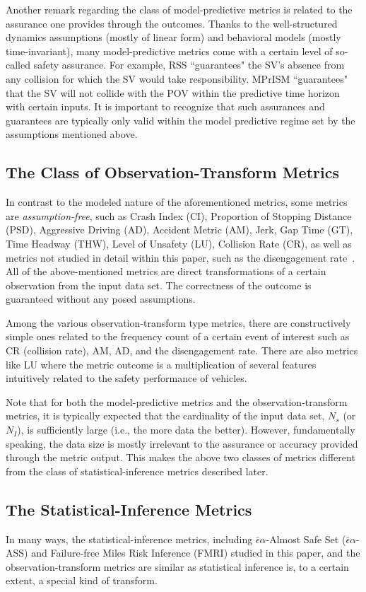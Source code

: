 \documentclass[journal]{IEEEtran}
\begin{document}
Another remark regarding the class of model-predictive metrics is related to the assurance one provides through the outcomes. Thanks to the well-structured dynamics assumptions (mostly of linear form) and behavioral models (mostly time-invariant), many model-predictive metrics come with a certain level of so-called safety assurance. For example, RSS ``guarantees" the SV's absence from any collision for which the SV would take responsibility. MPrISM ``guarantees" that the SV will not collide with the POV within the predictive time horizon with certain inputs. It is important to recognize that such assurances and guarantees are typically only valid within the model predictive regime set by the assumptions mentioned above.

\subsection{The Class of Observation-Transform Metrics}
In contrast to the modeled nature of the aforementioned metrics, some metrics are \emph{assumption-free}, such as Crash Index (CI), Proportion of Stopping Distance (PSD), Aggressive Driving (AD), Accident Metric (AM), Jerk, Gap Time (GT), Time Headway (THW), Level of Unsafety (LU), Collision Rate (CR), as well as metrics not studied in detail within this paper, such as the disengagement rate~\cite{nowakowski2015development}. All of the above-mentioned metrics are direct transformations of a certain observation from the input data set. The correctness of the outcome is guaranteed without any posed assumptions.

Among the various observation-transform type metrics, there are constructively simple ones related to the frequency count of a certain event of interest such as CR (collision rate), AM, AD, and the disengagement rate. There are also metrics like LU where the metric outcome is a multiplication of several features intuitively related to the safety performance of vehicles.

Note that for both the model-predictive metrics and the observation-transform metrics, it is typically expected that the cardinality of the input data set, $N_s$ (or $N_I$), is sufficiently large (i.e., the more data the better). However, fundamentally speaking, the data size is mostly irrelevant to the assurance or accuracy provided through the metric output. This makes the above two classes of metrics different from the class of statistical-inference metrics described later.

\subsection{The Statistical-Inference Metrics} 
In many ways, the statistical-inference metrics, including $\bar{\epsilon}\alpha$-Almost Safe Set ($\bar{\epsilon}\alpha$-ASS) and Failure-free Miles Risk Inference (FMRI) studied in this paper, and the observation-transform metrics are similar as statistical inference is, to a certain extent, a special kind of transform.
\end{document}
